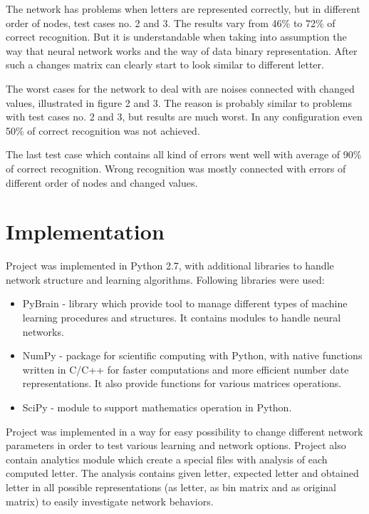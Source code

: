 \documentclass[a4paper, 11pt]{article}
\begin{document}
The network has problems when letters are represented correctly, but in different order of nodes, test cases no. 2 and 3. The results vary from 46\% to 72\% of correct recognition. But it is understandable when taking into assumption the way that neural network works and the way of data binary representation. After such a changes matrix can clearly start to look similar to different letter.

The worst cases for the network to deal with are noises connected with changed values, illustrated in figure 2 and 3. The reason is probably similar to problems with test cases no. 2 and 3, but results are much worst. In any configuration even 50\% of correct recognition was not achieved.

The last test case which contains all kind of errors went well with average of 90\% of correct recognition. Wrong recognition was mostly connected with errors of different order of nodes and changed values.


\section{Implementation}

Project was implemented in Python 2.7, with additional libraries to handle network structure and learning algorithms. Following libraries were used:

\begin{itemize}
  \item PyBrain - library which provide tool to manage different types of machine learning procedures and structures. It contains modules to handle neural networks.
  \item NumPy - package for scientific computing with Python, with native functions written in C/C++ for faster computations and more efficient number date representations. It also provide functions for various matrices operations.
  \item SciPy - module to support mathematics operation in Python.
\end{itemize}

Project was implemented in a way for easy possibility to change different network parameters in order to test various learning and network options. Project also contain analytics module which create a special files with analysis of each computed letter. The analysis contains given letter, expected letter and obtained letter in all possible representations (as letter, as bin matrix and as original matrix) to easily investigate network behaviors.
\end{document}
